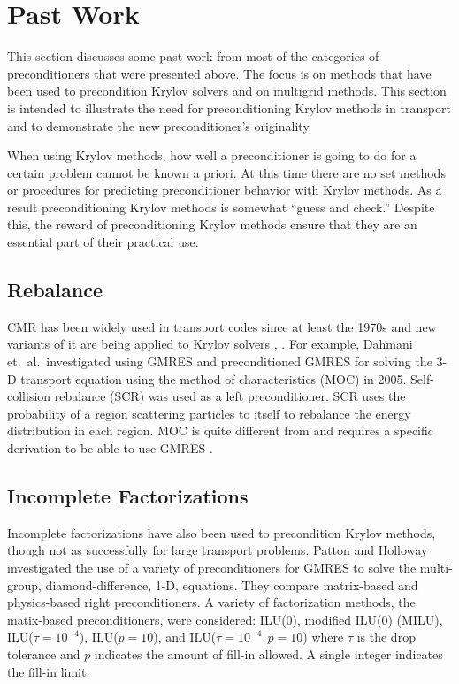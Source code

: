 \section{Past Work}
This section discusses some past work from most of the categories of preconditioners that were presented above. The focus is on methods that have been used to precondition Krylov solvers and on multigrid methods. This section is intended to illustrate the need for preconditioning Krylov methods in transport and to demonstrate the new preconditioner's originality. 

When using Krylov methods, how well a preconditioner is going to do for a certain problem cannot be known a priori. At this time there are no set methods or procedures for predicting preconditioner behavior with Krylov methods. As a result preconditioning Krylov methods is somewhat ``guess and check.'' Despite this, the reward of preconditioning Krylov methods ensure that they are an essential part of their practical use. 

\subsection{Rebalance}
CMR has been widely used in transport codes since at least the 1970s and new variants of it are being applied to Krylov solvers \cite{Dahmani2002}, \cite{Yamamoto2005}. For example, Dahmani et.\ al.\ investigated using GMRES and preconditioned GMRES for solving the 3-D transport equation using the method of characteristics (MOC) in 2005. Self-collision rebalance (SCR) was used as a left preconditioner. SCR uses the probability of a region scattering particles to itself to rebalance the energy distribution in each region. MOC is quite different from \Sn and requires a specific derivation to be able to use GMRES \cite{Dahmani2002}. 

\subsection{Incomplete Factorizations}
Incomplete factorizations have also been used to precondition Krylov methods, though not as successfully for large transport problems. Patton and Holloway investigated the use of a variety of preconditioners for GMRES to solve the multi-group, diamond-difference, 1-D, \Sn equations. They compare matrix-based and physics-based right preconditioners. A variety of factorization methods, the matix-based preconditioners, were considered: ILU(0), modified ILU(0) (MILU), ILU($\tau=10^{-4}$), ILU($p=10$), and ILU($\tau=10^{-4}, p=10$) where $\tau$ is the drop tolerance and $p$ indicates the amount of fill-in allowed. A single integer indicates the fill-in limit. 

